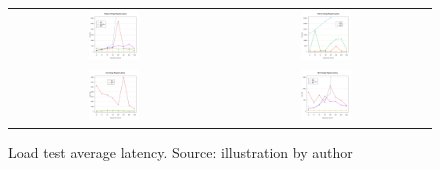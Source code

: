 \begin{figure}[htp]
\begin{center}
\begin{tabular}{c c}
\includegraphics[width=0.25\textwidth]{bilder/loadtest_average_latency/plot_average_latency_node.pdf} & \includegraphics[width=0.25\textwidth]{bilder/loadtest_average_latency/plot_average_latency_python.pdf} \\
\includegraphics[width=0.25\textwidth]{bilder/loadtest_average_latency/plot_average_latency_go.pdf} & \includegraphics[width=0.25\textwidth]{bilder/loadtest_average_latency/plot_average_latency_dotnet.pdf} \\
\end{tabular}
\captionsetup{justification=centering, labelfont=bf}
\caption[Load test average latency]{Load test average latency. Source: illustration by author}
\label{fig:load_test_latency_all}
\end{center}
\end{figure}

